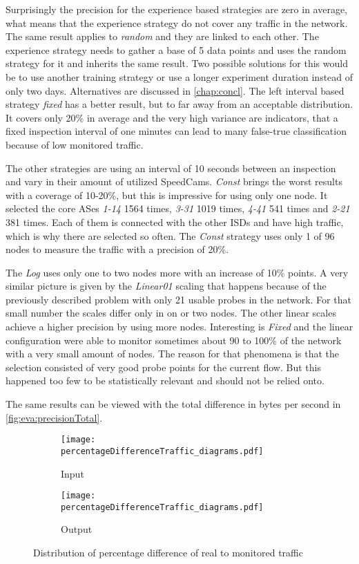 \documentclass[thesis.tex]{subfiles}
\begin{document}
Surprisingly the precision for the experience based strategies are zero in average, what means that the experience strategy do not cover any traffic in the network. The same result applies to \textit{random} and they are linked to each other. The experience strategy needs to gather a base of 5 data points and uses the random strategy for it and inherits the same result. Two possible solutions for this would be to use another training strategy or use a longer experiment duration instead of only two days. Alternatives are discussed in \autoref{chap:concl}. The left interval based strategy \textit{fixed} has a better result, but to far away from an acceptable distribution. It covers only 20\% in average and the very high variance are indicators, that a fixed inspection interval of one minutes can lead to many false-true classification because of low monitored traffic.

The other strategies are using an interval of 10 seconds between an inspection and vary in their amount of utilized SpeedCams. \textit{Const} brings the worst results with a coverage of 10-20\%, but this is impressive for using only one node. It selected the core ASes \textit{1-14} 1564 times, \textit{3-31} 1019 times, \textit{4-41} 541 times and \textit{2-21} 381 times. Each of them is connected with the other ISDs and have high traffic, which is why there are selected so often. The \textit{Const} strategy uses only 1 of 96 nodes to measure the traffic with a precision of 20\%.

The \textit{Log} uses only one to two nodes more with an increase of 10\% points. A very similar picture is given by the \textit{Linear01} scaling that happens because of the previously described problem with only 21 usable probes in the network. For that small number the scales differ only in on or two nodes. The other linear scales achieve a higher precision by using more nodes. Interesting is \textit{Fixed} and the linear configuration were able to monitor sometimes about 90 to 100\% of the network with a very small amount of nodes. The reason for that phenomena is that the selection consisted of very good probe points for the current flow. But this happened too few to be statistically relevant and should not be relied onto.

The same results can be viewed with the total difference in bytes per second in \autoref{fig:eva:precisionTotal}.

\begin{figure}[h]
	\centering
	\begin{subfigure}{.8\linewidth}
		\centering
		\texttt{[image: percentageDifferenceTraffic\_diagrams.pdf]}
		\caption{Input}
		\label{fig:eva:precisionPercent:input}
	\end{subfigure}
	\hfil
	\begin{subfigure}{0.8\linewidth}
		\centering
		\texttt{[image: percentageDifferenceTraffic\_diagrams.pdf]}
		\caption{Output}
		\label{fig:eva:precisionPercent:output}
	\end{subfigure}
	\caption{Distribution of percentage difference of real to monitored traffic}
	\label{fig:eva:precisionPercent}
\end{figure}
\end{document}
